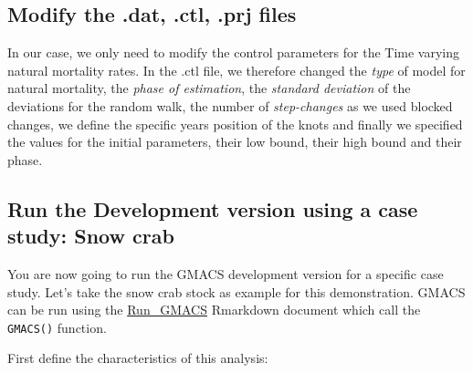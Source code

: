 \documentclass[
]{article}
\begin{document}
\hypertarget{modify-the-.dat-.ctl-.prj-files}{%
\subsection{Modify the .dat, .ctl, .prj
files}\label{modify-the-.dat-.ctl-.prj-files}}

In our case, we only need to modify the control parameters for the Time
varying natural mortality rates. In the .ctl file, we therefore changed
the \emph{type} of model for natural mortality, the \emph{phase of
estimation}, the \emph{standard deviation} of the deviations for the
random walk, the number of \emph{step-changes} as we used blocked
changes, we define the specific years position of the knots and finally
we specified the values for the initial parameters, their low bound,
their high bound and their phase.

\hypertarget{run-the-development-version-using-a-case-study-snow-crab}{%
\subsection{Run the Development version using a case study: Snow
crab}\label{run-the-development-version-using-a-case-study-snow-crab}}

You are now going to run the GMACS development version for a specific
case study. Let's take the snow crab stock as example for this
demonstration. GMACS can be run using the
\href{https://github.com/GMACS-project/GMACS_Assessment_code/blob/main/GMACS/Run_GMACS.Rmd}{Run\_GMACS}
Rmarkdown document which call the \texttt{GMACS()} function.

First define the characteristics of this analysis:
\end{document}
